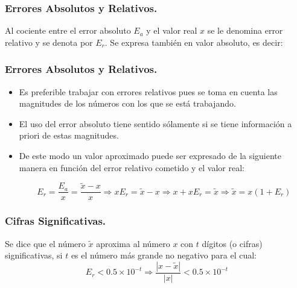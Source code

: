 \documentclass{beamer}
\begin{document}
\frame
{
  \frametitle{Errores Absolutos y Relativos.}
  Al cociente entre el error absoluto $E_a$ y el valor real $x$ se le denomina error relativo y se denota por $E_r$. Se 
expresa tambi\'en en valor absoluto, es decir:
}
\begin{frame}
\frametitle{Errores Absolutos y Relativos.}
\begin{itemize}
 \item<1-> Es preferible trabajar con errores relativos pues se toma en cuenta las magnitudes de los
 n\'umeros con los que se est\'a trabajando. 
 \item<2->El uso del error absoluto tiene sentido s\'olamente si se tiene informaci\'on a priori de estas magnitudes.
 \item <3-> De este modo un valor aproximado puede ser expresado de la siguiente manera en funci\'on del error relativo cometido y el valor real:
 \begin{block}{}
 $$
 E_r = \frac{E_a}{x} = \frac{\tilde x - x}{x}  \Rightarrow xE_r = \tilde x -x \Rightarrow x+xE_r =\tilde x \Rightarrow
 \tilde x = x(1+E_r)
 $$ 
 \end{block}
\end{itemize}
\end{frame}
\frame
{
  \frametitle{Cifras Significativas.}
  Se dice que el n\'umero $\tilde{x}$ aproxima al n\'umero $x$ con $t$ d\'igitos (o cifras) significativas, si $t$ es el n\'umero m\'as grande no negativo para el cual:
$$
E_r < 0.5\times10^{-t}\Rightarrow \frac{|x-\tilde{x}|}{|x|}<0.5\times10^{-t}
$$

}
\end{document}
